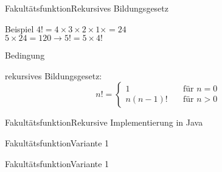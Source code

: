 \begin{frame}[shrink]{Fakultätsfunktion}{Rekursives Bildungsgesetz}
    \begin{block}{Beispiel}
        $4! = 4\times 3\times 2\times 1\times = 24$\\
        $5\times 24 = 120\rightarrow 5! = 5\times 4!$\\
    \end{block}
    \begin{block}{Bedingung}
    \end{block}
    \begin{block}{rekursives Bildungsgesetz:}
        \[
            n! = 
                \begin{cases}
                    1       &\quad\text{für }n = 0\\
                    n(n-1)! &\quad\text{für }n > 0
                \end{cases}
        \]
    \end{block}
\end{frame}



\begin{frame}{Fakultätsfunktion}{Rekursive Implementierung in Java}
\end{frame}

\begin{frame}{Fakultätsfunktion}{Variante 1}
\end{frame}
\begin{frame}{Fakultätsfunktion}{Variante 1}
\end{frame}
